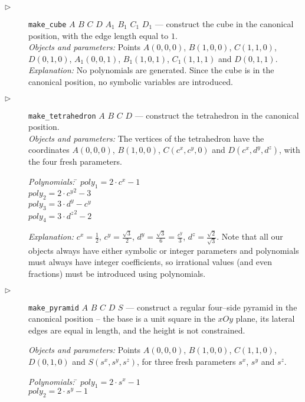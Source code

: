 \documentclass[final,1p,times,authoryear]{elsarticle}
\begin{document}
\begin{description}
\item[$\triangleright$] {\tt make\_cube} $A$ $B$ $C$ $D$ $A_1$ $B_1$
  $C_1$ $D_1$ --- construct the cube in the canonical position, with
  the edge length equal to $1$.\\
  {\em Objects and parameters:} Points $A(0, 0, 0)$, $B(1, 0, 0)$,
  $C(1, 1, 0)$, $D(0, 1, 0)$, $A_1(0, 0, 1)$, $B_1(1, 0, 1)$,
  $C_1(1, 1, 1)$ and $D(0, 1, 1)$.\\
  {\em Explanation:} No polynomials are generated. Since the cube is
  in the canonical position, no symbolic variables are introduced.

\item[$\triangleright$] {\tt make\_tetrahedron} $A$ $B$ $C$
  $D$\label{tetrahedron} --- construct the tetrahedron in the
  canonical position.\\
  {\em Objects and parameters:} The vertices of the tetrahedron have
  the coordinates $A(0, 0, 0)$, $B(1, 0, 0)$, $C(c^x, c^y, 0)$ and
  $D(c^x, d^y, d^z)$, with the four fresh parameters.
\begin{tabbing}
{\em Polynomials:} \= $poly_1 = 2\cdot c^x - 1$ \\
                   \> $poly_2 = 2\cdot {c^y}^2 - 3$ \\
                   \> $poly_3 = 3\cdot d^y - c^y$ \\
                   \> $poly_4 = 3\cdot {d^z}^2 - 2$
\end{tabbing}

{\em Explanation:} $c^x = \frac{1}{2}$, $c^y = \frac{\sqrt{3}}{2}$,
$d^y = \frac{\sqrt{3}}{6} = \frac{c^y}{3}$, $d^z =
\frac{\sqrt{2}}{\sqrt{3}}$. Note that all our objects always have
either symbolic or integer parameters and polynomials must always have
integer coefficients, so irrational values (and even fractions) must
be introduced using polynomials.

\item[$\triangleright$] {\tt make\_pyramid} $A$ $B$ $C$ $D$ $S$ ---
  construct a regular four--side pyramid in the canonical position --
  the base is a unit square in the $xOy$ plane, its lateral edges are
  equal in length, and the height is not constrained.

  {\em Objects and parameters:} Points $A(0, 0, 0)$, $B(1, 0, 0)$,
  $C(1, 1, 0)$, $D(0, 1, 0)$ and $S(s^x, s^y, s^z)$, for three fresh
  parameters $s^x$, $s^y$ and $s^z$.
\begin{tabbing}
{\em Polynomials:} \= $poly_1 = 2\cdot s^x - 1$ \\
                   \> $poly_2 = 2\cdot s^y - 1$
\end{tabbing}


\end{description}
\end{document}
